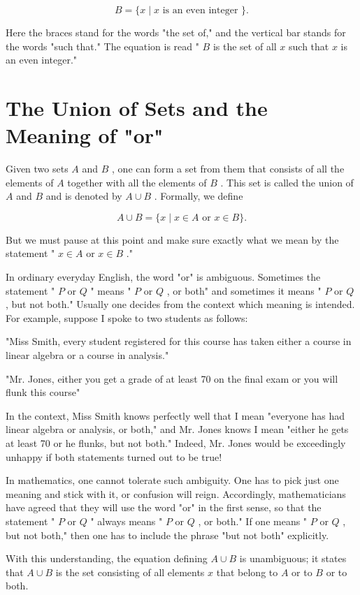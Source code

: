 \[
B = \{ x \mid  x\text{ is an even integer }\} .
\]

Here the braces stand for the words "the set of," and the vertical bar stands for the words "such that." The equation is read " \(B\) is the set of all \(x\) such that \(x\) is an even integer."

\section*{The Union of Sets and the Meaning of "or"}

Given two sets \(A\) and \(B\) , one can form a set from them that consists of all the elements of \(A\) together with all the elements of \(B\) . This set is called the union of \(A\) and \(B\) and is denoted by \(A \cup  B\) . Formally, we define

\[
A \cup  B = \{ x \mid  x \in  A\text{ or }x \in  B\} .
\]

But we must pause at this point and make sure exactly what we mean by the statement " \(x \in  A\) or \(x \in  B\) ."

In ordinary everyday English, the word "or" is ambiguous. Sometimes the statement " \(P\) or \(Q\) " means " \(P\) or \(Q\) , or both" and sometimes it means " \(P\) or \(Q\) , but not both." Usually one decides from the context which meaning is intended. For example, suppose I spoke to two students as follows:

"Miss Smith, every student registered for this course has taken either a course in linear algebra or a course in analysis."

"Mr. Jones, either you get a grade of at least 70 on the final exam or you will flunk this course"

In the context, Miss Smith knows perfectly well that I mean "everyone has had linear algebra or analysis, or both," and Mr. Jones knows I mean "either he gets at least 70 or he flunks, but not both." Indeed, Mr. Jones would be exceedingly unhappy if both statements turned out to be true!

In mathematics, one cannot tolerate such ambiguity. One has to pick just one meaning and stick with it, or confusion will reign. Accordingly, mathematicians have agreed that they will use the word "or" in the first sense, so that the statement " \(P\) or \(Q\) " always means " \(P\) or \(Q\) , or both." If one means " \(P\) or \(Q\) , but not both," then one has to include the phrase "but not both" explicitly.

With this understanding, the equation defining \(A \cup  B\) is unambiguous; it states that \(A \cup  B\) is the set consisting of all elements \(x\) that belong to \(A\) or to \(B\) or to both.

